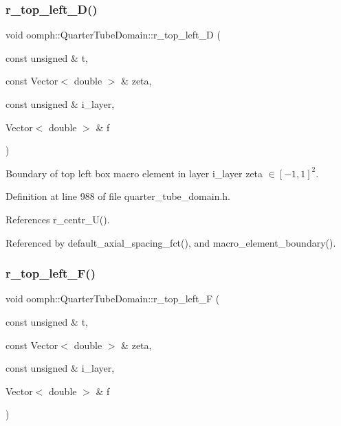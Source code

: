 \subsubsection{\texorpdfstring{r\+\_\+top\+\_\+left\+\_\+\+D()}{r\_top\_left\_D()}}
{\footnotesize\ttfamily void oomph\+::\+Quarter\+Tube\+Domain\+::r\+\_\+top\+\_\+left\+\_\+D (\begin{DoxyParamCaption}\item[{const unsigned \&}]{t,  }\item[{const Vector$<$ double $>$ \&}]{zeta,  }\item[{const unsigned \&}]{i\+\_\+layer,  }\item[{Vector$<$ double $>$ \&}]{f }\end{DoxyParamCaption})\hspace{0.3cm}{\ttfamily [private]}}



Boundary of top left box macro element in layer i\+\_\+layer zeta $ \in [-1,1]^2 $. 



Definition at line 988 of file quarter\+\_\+tube\+\_\+domain.\+h.



References r\+\_\+centr\+\_\+\+U().



Referenced by default\+\_\+axial\+\_\+spacing\+\_\+fct(), and macro\+\_\+element\+\_\+boundary().

\mbox{\label{classoomph_1_1QuarterTubeDomain_aee4f92da89db4fd8a7ff6e25995e1ca5}} 
\subsubsection{\texorpdfstring{r\+\_\+top\+\_\+left\+\_\+\+F()}{r\_top\_left\_F()}}
{\footnotesize\ttfamily void oomph\+::\+Quarter\+Tube\+Domain\+::r\+\_\+top\+\_\+left\+\_\+F (\begin{DoxyParamCaption}\item[{const unsigned \&}]{t,  }\item[{const Vector$<$ double $>$ \&}]{zeta,  }\item[{const unsigned \&}]{i\+\_\+layer,  }\item[{Vector$<$ double $>$ \&}]{f }\end{DoxyParamCaption})\hspace{0.3cm}{\ttfamily [private]}}



